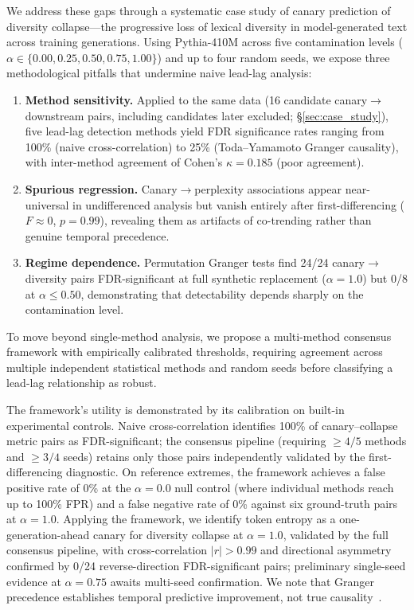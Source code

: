 We address these gaps through a systematic case study of canary prediction of diversity collapse---the progressive loss of lexical diversity in model-generated text across training generations.
Using Pythia-410M across five contamination levels ($\alpha \in \{0.00, 0.25, 0.50, 0.75, 1.00\}$) and up to four random seeds, we expose three methodological pitfalls that undermine naive lead-lag analysis:
\begin{enumerate}
    \item \textbf{Method sensitivity.} Applied to the same data (16 candidate canary$\to$downstream pairs, including candidates later excluded; \S\ref{sec:case_study}), five lead-lag detection methods yield FDR significance rates ranging from 100\% (naive cross-correlation) to 25\% (Toda--Yamamoto Granger causality), with inter-method agreement of Cohen's $\kappa{=}0.185$ (poor agreement).
    \item \textbf{Spurious regression.} Canary$\to$perplexity associations appear near-universal in undifferenced analysis but vanish entirely after first-differencing ($F{\approx}0$, $p{=}0.99$), revealing them as artifacts of co-trending rather than genuine temporal precedence.
    \item \textbf{Regime dependence.} Permutation Granger tests find 24/24 canary$\to$diversity pairs FDR-significant at full synthetic replacement ($\alpha{=}1.0$) but 0/8 at $\alpha{\leq}0.50$, demonstrating that detectability depends sharply on the contamination level.
\end{enumerate}
To move beyond single-method analysis, we propose a multi-method consensus framework with empirically calibrated thresholds, requiring agreement across multiple independent statistical methods and random seeds before classifying a lead-lag relationship as robust.

The framework's utility is demonstrated by its calibration on built-in experimental controls.
Naive cross-correlation identifies 100\% of canary--collapse metric pairs as FDR-significant; the consensus pipeline (requiring ${\geq}4/5$ methods and ${\geq}3/4$ seeds) retains only those pairs independently validated by the first-differencing diagnostic.
On reference extremes, the framework achieves a false positive rate of 0\% at the $\alpha{=}0.0$ null control (where individual methods reach up to 100\% FPR) and a false negative rate of 0\% against six ground-truth pairs at $\alpha{=}1.0$.
Applying the framework, we identify token entropy as a one-generation-ahead canary for diversity collapse at $\alpha{=}1.0$, validated by the full consensus pipeline, with cross-correlation $|r|{>}0.99$ and directional asymmetry confirmed by 0/24 reverse-direction FDR-significant pairs; preliminary single-seed evidence at $\alpha{=}0.75$ awaits multi-seed confirmation.
We note that Granger precedence establishes temporal predictive improvement, not true causality~\cite{shojaie2022granger}.

